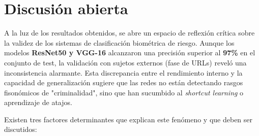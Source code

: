 \section{Discusión abierta}

A la luz de los resultados obtenidos, se abre un espacio de reflexión crítica sobre la validez de los sistemas de clasificación biométrica de riesgo. Aunque los modelos \textbf{ResNet50 y VGG-16} alcanzaron una precisión superior al \textbf{97\%} en el conjunto de test, la validación con sujetos externos (fase de URLs) reveló una inconsistencia alarmante. Esta discrepancia entre el rendimiento interno y la capacidad de generalización sugiere que las redes no están detectando rasgos fisonómicos de "criminalidad", sino que han sucumbido al \textit{shortcut learning} o aprendizaje de atajos.

Existen tres factores determinantes que explican este fenómeno y que deben ser discutidos:

